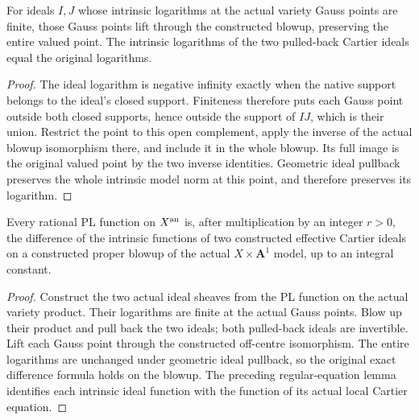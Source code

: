 \begin{lemma}
\label{lem:pl-blowup-gauss-lift}
\leanok
For ideals $I,J$ whose intrinsic logarithms at the actual variety Gauss
points are finite, those Gauss points lift through the constructed
blowup, preserving the entire valued point.  The intrinsic logarithms
of the two pulled-back Cartier ideals equal the original logarithms.
\end{lemma}
\begin{proof}
The ideal logarithm is negative infinity exactly when the native support
belongs to the ideal's closed support.  Finiteness therefore puts each
Gauss point outside both closed supports, hence outside the support of
$IJ$, which is their union.  Restrict the point to this open complement,
apply the inverse of the actual blowup isomorphism there, and include it
in the whole blowup.  Its full image is the original valued point by the
two inverse identities.  Geometric ideal pullback preserves the whole
intrinsic model norm at this point, and therefore preserves its logarithm.
\end{proof}

\begin{proposition}
\label{prop:pl-native-cartier-ideal-models}
\leanok
Every rational PL function on $X^{\rm an}$ is, after multiplication by
an integer $r>0$, the difference of the intrinsic functions of two
constructed effective Cartier ideals on a constructed proper blowup of
the actual $X\times\mathbf A^1$ model, up to an integral constant.
\end{proposition}
\begin{proof}
Construct the two actual ideal sheaves from the PL function on the actual
variety product.  Their logarithms are finite at the actual Gauss points.
Blow up their product and pull back the two ideals; both pulled-back
ideals are invertible.  Lift each Gauss point through the constructed
off-centre isomorphism.  The entire logarithms are unchanged under
geometric ideal pullback, so the original exact difference formula holds
on the blowup.  The preceding regular-equation lemma identifies each
intrinsic ideal function with the function of its actual local Cartier
equation.
\end{proof}

